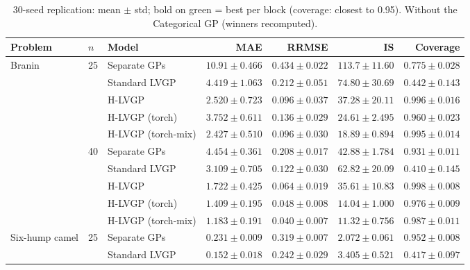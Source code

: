 \begin{table}[htbp]
\centering
\footnotesize
\renewcommand{\arraystretch}{0.85}
\setlength{\tabcolsep}{3pt}
\caption{30-seed replication: mean $\pm$ std; bold on green = best per block (coverage: closest to 0.95). Without the Categorical GP (winners recomputed).}
\label{tab:seeds_nocat}
\begin{tabular}{lllrrrr}
\toprule
Problem & $n$ & Model & MAE & RRMSE & IS & Coverage \\
\midrule
\multirow{10}{*}{Branin} & \multirow{5}{*}{25} & Separate GPs & $10.91 \pm 0.466$ & $0.434 \pm 0.022$ & $113.7 \pm 11.60$ & $0.775 \pm 0.028$ \\
 &  & Standard LVGP & $4.419 \pm 1.063$ & $0.212 \pm 0.051$ & $74.80 \pm 30.69$ & $0.442 \pm 0.143$ \\
 &  & H-LVGP & $2.520 \pm 0.723$ & \colorbox{green!20}{\boldmath$0.096 \pm 0.037$} & $37.28 \pm 20.11$ & $0.996 \pm 0.016$ \\
 &  & H-LVGP (torch) & $3.752 \pm 0.611$ & $0.136 \pm 0.029$ & $24.61 \pm 2.495$ & \colorbox{green!20}{\boldmath$0.960 \pm 0.023$} \\
 &  & H-LVGP (torch-mix) & \colorbox{green!20}{\boldmath$2.427 \pm 0.510$} & $0.096 \pm 0.030$ & \colorbox{green!20}{\boldmath$18.89 \pm 0.894$} & $0.995 \pm 0.014$ \\
\cmidrule(lr){2-7}
 & \multirow{5}{*}{40} & Separate GPs & $4.454 \pm 0.361$ & $0.208 \pm 0.017$ & $42.88 \pm 1.784$ & \colorbox{green!20}{\boldmath$0.931 \pm 0.011$} \\
 &  & Standard LVGP & $3.109 \pm 0.705$ & $0.122 \pm 0.030$ & $62.82 \pm 20.09$ & $0.410 \pm 0.145$ \\
 &  & H-LVGP & $1.722 \pm 0.425$ & $0.064 \pm 0.019$ & $35.61 \pm 10.83$ & $0.998 \pm 0.008$ \\
 &  & H-LVGP (torch) & $1.409 \pm 0.195$ & $0.048 \pm 0.008$ & $14.04 \pm 1.000$ & $0.976 \pm 0.009$ \\
 &  & H-LVGP (torch-mix) & \colorbox{green!20}{\boldmath$1.183 \pm 0.191$} & \colorbox{green!20}{\boldmath$0.040 \pm 0.007$} & \colorbox{green!20}{\boldmath$11.32 \pm 0.756$} & $0.987 \pm 0.011$ \\
\midrule
\multirow{10}{*}{Six-hump camel} & \multirow{5}{*}{25} & Separate GPs & $0.231 \pm 0.009$ & $0.319 \pm 0.007$ & $2.072 \pm 0.061$ & \colorbox{green!20}{\boldmath$0.952 \pm 0.008$} \\
 &  & Standard LVGP & \colorbox{green!20}{\boldmath$0.152 \pm 0.018$} & \colorbox{green!20}{\boldmath$0.242 \pm 0.029$} & $3.405 \pm 0.521$ & $0.417 \pm 0.097$ \\

\end{tabular}
\end{table}
